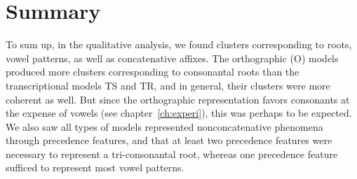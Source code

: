 {\begin{table}
\setlength{\extrarowheight}{3pt}
\caption{Extrinsic evaluation results at $K = 1000$}%
\label{tab:extr-results-1000}
\end{table}

\section{Summary}
To sum up, in the qualitative analysis, we found clusters corresponding to roots, vowel patterns, as well as concatenative affixes. The orthographic (O) models produced more clusters corresponding to consonantal roots than the transcriptional models TS and TR, and in general, their clusters were more coherent as well. But since the orthographic representation favors consonants at the expense of vowels (see chapter~\ref{ch:experi}), this was perhaps to be expected. We also saw all types of models represented nonconcatenative phenomena through precedence features, and that at least two precedence features were necessary to represent a tri-consonantal root, whereas one precedence feature sufficed to represent most vowel patterns.


}

